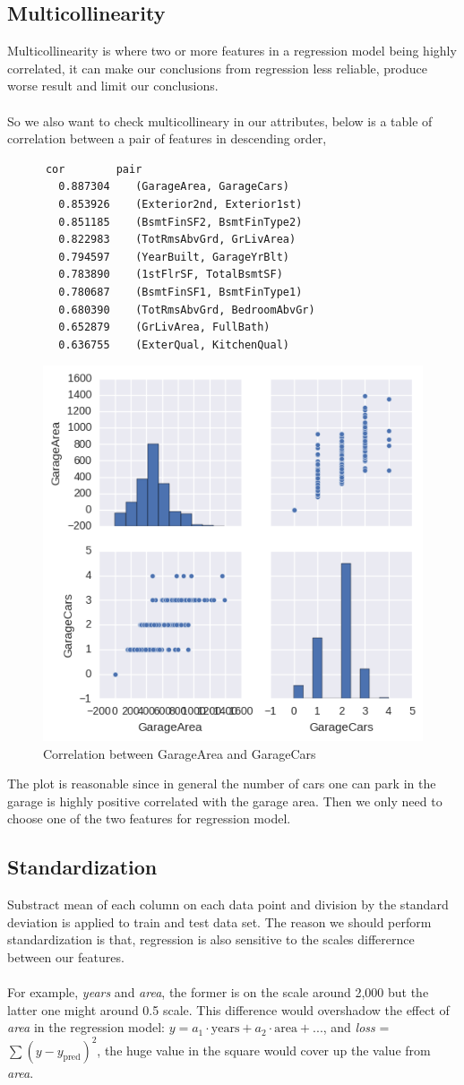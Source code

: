 \documentclass[12pt]{article}
\begin{document}
\subsection{Multicollinearity}
Multicollinearity is where two or more features in a regression model being highly correlated, it can make our conclusions from regression less reliable, produce worse result and limit our conclusions.\\
\\
So we also want to check multicollineary in our attributes, below is a table of correlation between a pair of features in descending order, 
\begin{verbatim}
 	  cor 	     pair
 	 	0.887304 	(GarageArea, GarageCars)
 	 	0.853926 	(Exterior2nd, Exterior1st)
 	 	0.851185 	(BsmtFinSF2, BsmtFinType2)
 	 	0.822983 	(TotRmsAbvGrd, GrLivArea)
 	 	0.794597 	(YearBuilt, GarageYrBlt)
 	 	0.783890 	(1stFlrSF, TotalBsmtSF)
 	 	0.780687 	(BsmtFinSF1, BsmtFinType1)
 	 	0.680390 	(TotRmsAbvGrd, BedroomAbvGr)
 	 	0.652879 	(GrLivArea, FullBath)
 	 	0.636755 	(ExterQual, KitchenQual)
\end{verbatim}
\begin{figure}[h!]
	\centering
	\includegraphics[width=0.6\linewidth]{cor.png}
	\caption{Correlation between GarageArea and GarageCars}
	\label{fig:4}
\end{figure}
The plot is reasonable since in general the number of cars one can park in the garage is highly positive correlated with the garage area. Then we only need to choose one of the two features for regression model.
\subsection{Standardization}
Substract mean of each column on each data point and division by the standard deviation is applied to train and test data set. The reason we should perform standardization is that, regression is also sensitive to the scales differernce between our features. \\
\\
For example, \textit{years} and \textit{area}, the former is on the scale around 2,000 but the latter one might around 0.5 scale. This difference would overshadow the effect of \textit{area} in the regression model: $y = a_1\cdot\text{years}+a_2\cdot\text{area}+ ...$, and \textit{loss} = $\sum(y-y_{\text{pred}})^2$, the huge value in the square would cover up the value from \textit{area}. 
\end{document}
